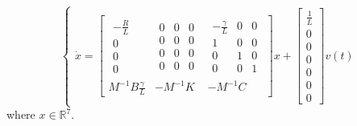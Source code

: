 \begin{equation}
\begin{cases}
\dot{x}=
\left[ \begin{array} { c|c|c  } 
                \begin{array}{c} 
               -\frac{R}{L} \\ 
                0 \\
                0 \\
                0
                \end{array} &
                \begin{array}{ccc} 
               0 & 0 & 0\\ 
                0 & 0  &0 \\
                0  & 0  & 0\\
                0 & 0 &0
                \end{array}&
                \begin{array}{ccc} 
               -\frac{\gamma}{L} & 0 &0\\ 
                1 & 0 &0 \\
                0  & 1  &0 \\
                0 & 0 & 1
                \end{array} \\
                \hline 
                M^{-1}B\frac{\gamma} {L}& -M^{-1}K & -M^{-1}C
\end{array} \right] 
x+\begin{bmatrix}\frac{1}{L} \\ 0 \\ 0 \\ 0 \\ 0\\0 \\0 \end{bmatrix}v(t)
\end{cases}
\end{equation}
where $x \in \mathbb{R}^7$.
